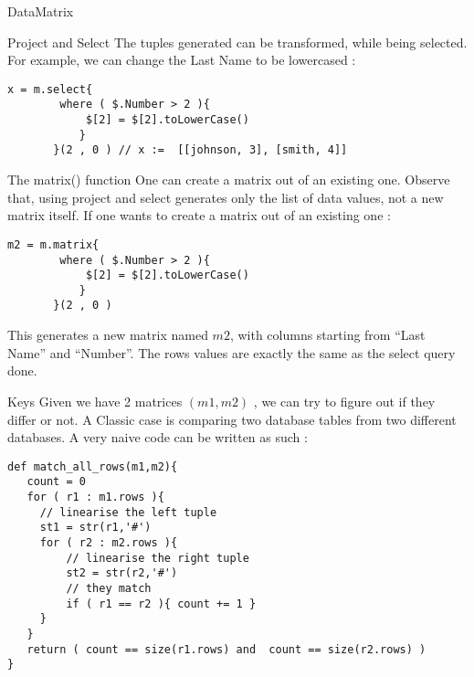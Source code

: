 \begin{section}{DataMatrix}
\begin{subsection}{Project and Select}
The tuples generated can be transformed, while being selected.
For example, we can change the Last Name to be lowercased :

\begin{lstlisting}[style=JexlStyle]
x = m.select{  
        where ( $.Number > 2 ){ 
            $[2] = $[2].toLowerCase() 
           }  
       }(2 , 0 ) // x :=  [[johnson, 3], [smith, 4]]
\end{lstlisting}

\end{subsection}

\begin{subsection}{The matrix() function}
One can create a matrix out of an existing one.
Observe that, using project and select generates only the list of data values, 
not a new matrix itself. If one wants to create a matrix out of an existing one :

\begin{lstlisting}[style=JexlStyle]
m2 = m.matrix{  
        where ( $.Number > 2 ){ 
            $[2] = $[2].toLowerCase() 
           }  
       }(2 , 0 ) 
\end{lstlisting}
This generates a new matrix named $m2$, with columns starting from ``Last Name'' and ``Number''.
The rows values are exactly the same as the select query done.

\end{subsection}


\begin{subsection}{Keys}
Given we have 2 matrices $(m1,m2)$ , we can try to figure out if they differ or not.
A Classic case is comparing two database tables from two different databases.
A very naive code can be written as such :

\begin{center}\begin{minipage}{\linewidth}
\begin{lstlisting}[style=JexlStyle]
def match_all_rows(m1,m2){
   count = 0 
   for ( r1 : m1.rows ){
     // linearise the left tuple
     st1 = str(r1,'#')
     for ( r2 : m2.rows ){
         // linearise the right tuple
         st2 = str(r2,'#')
         // they match 
         if ( r1 == r2 ){ count += 1 } 
     }
   }
   return ( count == size(r1.rows) and  count == size(r2.rows) )
}
\end{lstlisting}
\end{minipage}\end{center}



\end{subsection}
\end{section}

